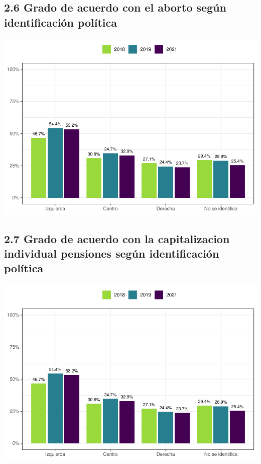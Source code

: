 \documentclass[
  12pt,
]{book}
\begin{document}
\hypertarget{grado-de-acuerdo-con-el-aborto-seguxfan-identificaciuxf3n-poluxedtica}{%
\subsection{2.6 Grado de acuerdo con el aborto según identificación política}\label{grado-de-acuerdo-con-el-aborto-seguxfan-identificaciuxf3n-poluxedtica}}

\includegraphics{reporte-elsoc_files/figure-latex/unnamed-chunk-20-1.pdf}

\hypertarget{grado-de-acuerdo-con-la-capitalizacion-individual-pensiones-seguxfan-identificaciuxf3n-poluxedtica}{%
\subsection{2.7 Grado de acuerdo con la capitalizacion individual pensiones según identificación política}\label{grado-de-acuerdo-con-la-capitalizacion-individual-pensiones-seguxfan-identificaciuxf3n-poluxedtica}}

\includegraphics{reporte-elsoc_files/figure-latex/unnamed-chunk-21-1.pdf}
\end{document}
